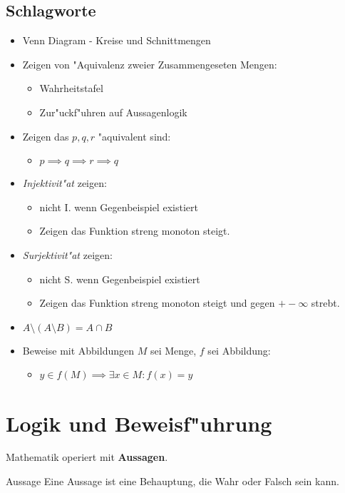 \documentclass[11pt]{article}
\begin{document}
\subsection{Schlagworte}
\label{sec:org0cab6a2}
\begin{itemize}
\item Venn Diagram - Kreise und Schnittmengen
\item Zeigen von "Aquivalenz zweier Zusammengeseten Mengen:
\begin{itemize}
\item Wahrheitstafel
\item Zur"uckf"uhren auf Aussagenlogik
\end{itemize}
\item Zeigen das \(p,q,r\) "aquivalent sind:
\begin{itemize}
\item \(p\implies q \implies r \implies q\)
\end{itemize}
\item \emph{Injektivit"at} zeigen:
\begin{itemize}
\item nicht I. wenn Gegenbeispiel existiert
\item Zeigen das Funktion streng monoton steigt.
\end{itemize}
\item \emph{Surjektivit"at} zeigen:
\begin{itemize}
\item nicht S. wenn Gegenbeispiel existiert
\item Zeigen das Funktion streng monoton steigt und gegen \(+-\infty\) strebt.
\end{itemize}
\item \(A\setminus (A\setminus B) = A \cap B\)
\item Beweise mit Abbildungen \(M\) sei Menge, \(f\) sei Abbildung:
\begin{itemize}
\item \(y \in f(M) \implies \exists x \in M : f(x)=y\)
\end{itemize}
\end{itemize}

\section{Logik und Beweisf"uhrung}
\label{sec:orgc083250}
Mathematik operiert mit \textbf{Aussagen}.

\begin{definition}{Aussage}{}
Eine Aussage ist eine Behauptung, die Wahr oder Falsch sein kann.
\end{definition}
\end{document}
